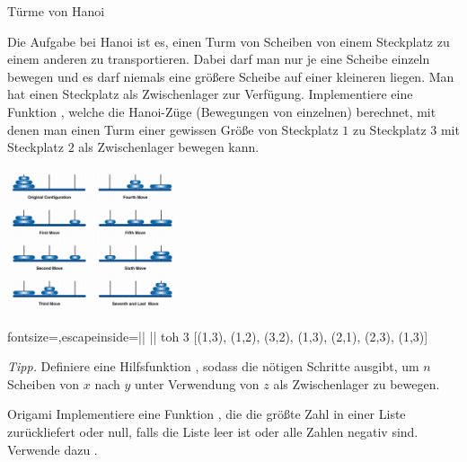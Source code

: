 \documentclass{uebblatt}
\begin{document}
\begin{aufgabe}{Türme von Hanoi}
  \begin{minipage}[m]{0.67 \linewidth}
    Die Aufgabe bei Hanoi ist es, einen Turm von Scheiben von einem Steckplatz zu einem anderen zu transportieren. Dabei darf man nur je eine Scheibe einzeln bewegen und es darf niemals eine größere Scheibe auf einer kleineren liegen. Man hat einen Steckplatz als Zwischenlager zur Verfügung.
    Implementiere eine Funktion , welche die Hanoi-Züge (Bewegungen von einzelnen) berechnet, mit denen man einen Turm einer gewissen Größe von Steckplatz $1$ zu Steckplatz $3$ mit Steckplatz $2$ als Zwischenlager bewegen kann.
  \end{minipage}
  \begin{minipage}{0.32 \linewidth}
    \hfill \includegraphics[width=5cm]{towers-hanoi.png}
  \end{minipage}
  
  \begin{haskellcode*}{fontsize=\small,escapeinside=||}
|\ghci| toh 3
[(1,3), (1,2), (3,2), (1,3), (2,1), (2,3), (1,3)]
  \end{haskellcode*}
  
  {\scriptsize \emph{Tipp.} Definiere eine Hilfsfunktion , sodass  die nötigen Schritte ausgibt, um $n$ Scheiben von $x$ nach $y$ unter Verwendung von $z$ als Zwischenlager zu bewegen.}
\end{aufgabe}

\begin{aufgabe}{Origami}
  Implementiere eine Funktion , die die größte Zahl in einer Liste zurückliefert oder null, falls die Liste leer ist oder alle Zahlen negativ sind. Verwende dazu .
\end{aufgabe}
\end{document}
